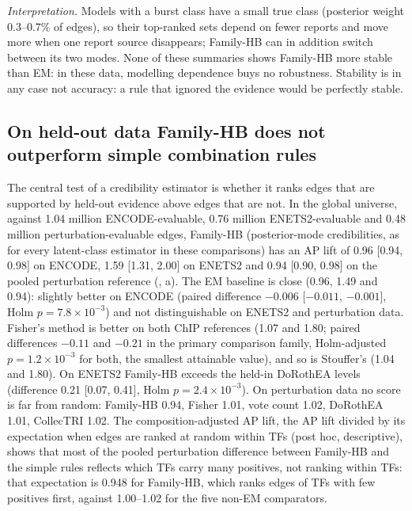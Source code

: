 \documentclass[11pt,a4paper]{article}
\begin{document}
\emph{Interpretation.} Models with a burst class have a small true class (posterior weight 0.3--0.7\% of edges), so their top-ranked sets depend on fewer reports and move more when one report source disappears; Family-HB can in addition switch between its two modes.
None of these summaries shows Family-HB more stable than EM: in these data, modelling dependence buys no robustness.
Stability is in any case not accuracy: a rule that ignored the evidence would be perfectly stable.


\subsection{On held-out data Family-HB does not outperform simple combination rules}\label{sec:res-heldout}

The central test of a credibility estimator is whether it ranks edges that are supported by held-out evidence above edges that are not.
In the global universe, against 1.04 million ENCODE-evaluable, 0.76 million ENETS2-evaluable and 0.48 million perturbation-evaluable edges, Family-HB (posterior-mode credibilities, as for every latent-class estimator in these comparisons) has an AP lift of 0.96 [0.94, 0.98] on ENCODE, 1.59 [1.31, 2.00] on ENETS2 and 0.94 [0.90, 0.98] on the pooled perturbation reference (, a).
The EM baseline is close (0.96, 1.49 and 0.94): slightly better on ENCODE (paired difference \ensuremath{-0.006} [\ensuremath{-0.011}, \ensuremath{-0.001}], Holm $p=\ensuremath{7.8\times10^{-3}}$) and not distinguishable on ENETS2 and perturbation data.
Fisher's method is better on both ChIP references (1.07 and 1.80; paired differences \ensuremath{-0.11} and \ensuremath{-0.21} in the primary comparison family, Holm-adjusted $p=\ensuremath{1.2\times10^{-3}}$ for both, the smallest attainable value), and so is Stouffer's (1.04 and 1.80).
On ENETS2 Family-HB exceeds the held-in DoRothEA levels (difference 0.21 [0.07, 0.41], Holm $p=\ensuremath{2.4\times10^{-3}}$).
On perturbation data no score is far from random: Family-HB 0.94, Fisher 1.01, vote count 1.02, DoRothEA 1.01, CollecTRI 1.02.
The composition-adjusted AP lift, the AP lift divided by its expectation when edges are ranked at random within TFs (post hoc, descriptive), shows that most of the pooled perturbation difference between Family-HB and the simple rules reflects which TFs carry many positives, not ranking within TFs: that expectation is 0.948 for Family-HB, which ranks edges of TFs with few positives first, against 1.00--1.02 for the five non-EM comparators.
\end{document}
